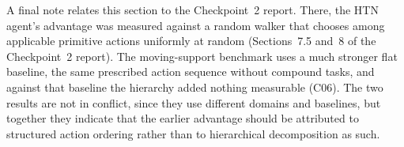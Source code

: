 A final note relates this section to the Checkpoint~2 report. There, the HTN agent's advantage was
measured against a random walker that chooses among applicable primitive actions uniformly at random
(Sections~7.5 and~8 of the Checkpoint~2 report). The moving-support benchmark uses a much stronger flat
baseline, the same prescribed action sequence without compound tasks, and against that baseline the
hierarchy added nothing measurable (C06). The two results are not in conflict, since they use different
domains and baselines, but together they indicate that the earlier advantage should be attributed to
structured action ordering rather than to hierarchical decomposition as such.
